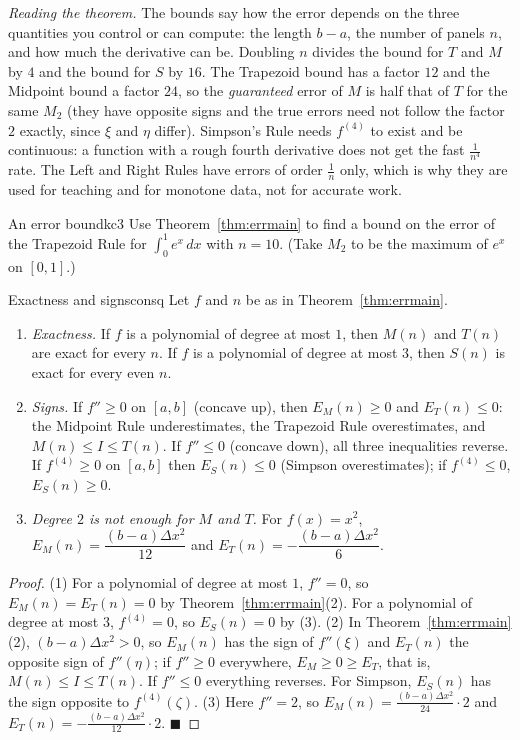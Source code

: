 \documentclass[11pt]{article}
\begin{document}
\emph{Reading the theorem.} The bounds say how the error depends on the three quantities you control or can compute: the length $b-a$, the number of panels $n$, and how much the derivative can be. Doubling $n$ divides the bound for $T$ and $M$ by $4$ and the bound for $S$ by $16$. The Trapezoid bound has a factor $12$ and the Midpoint bound a factor $24$, so the \emph{guaranteed} error of $M$ is half that of $T$ for the same $M_2$ (they have opposite signs and the true errors need not follow the factor $2$ exactly, since $\xi$ and $\eta$ differ). Simpson's Rule needs $f^{(4)}$ to exist and be continuous: a function with a rough fourth derivative does not get the fast $\frac1{n^4}$ rate. The Left and Right Rules have errors of order $\frac1n$ only, which is why they are used for teaching and for monotone data, not for accurate work.

\begin{kc}{An error bound}{kc3}
Use Theorem~\ref{thm:errmain} to find a bound on the error of the Trapezoid Rule for $\displaystyle\int_0^1e^x\,dx$ with $n=10$. (Take $M_2$ to be the maximum of $e^x$ on $[0,1]$.)
\end{kc}

\begin{thm}{Exactness and signs}{consq}
Let $f$ and $n$ be as in Theorem~\ref{thm:errmain}.
\begin{enumerate}[label=(\arabic*),leftmargin=*]
  \item \emph{Exactness.} If $f$ is a polynomial of degree at most $1$, then $M(n)$ and $T(n)$ are exact for every $n$. If $f$ is a polynomial of degree at most $3$, then $S(n)$ is exact for every even $n$.
  \item \emph{Signs.} If $f''\ge0$ on $[a,b]$ (concave up), then $E_M(n)\ge0$ and $E_T(n)\le0$: the Midpoint Rule underestimates, the Trapezoid Rule overestimates, and $M(n)\le I\le T(n)$. If $f''\le0$ (concave down), all three inequalities reverse. If $f^{(4)}\ge0$ on $[a,b]$ then $E_S(n)\le0$ (Simpson overestimates); if $f^{(4)}\le0$, $E_S(n)\ge0$.
  \item \emph{Degree $2$ is not enough for $M$ and $T$.} For $f(x)=x^2$, $E_M(n)=\dfrac{(b-a)\Delta x^2}{12}$ and $E_T(n)=-\dfrac{(b-a)\Delta x^2}{6}$.
\end{enumerate}
\end{thm}
\begin{proof}
(1) For a polynomial of degree at most $1$, $f''=0$, so $E_M(n)=E_T(n)=0$ by Theorem~\ref{thm:errmain}(2). For a polynomial of degree at most $3$, $f^{(4)}=0$, so $E_S(n)=0$ by (3). (2) In Theorem~\ref{thm:errmain}(2), $(b-a)\Delta x^2>0$, so $E_M(n)$ has the sign of $f''(\xi)$ and $E_T(n)$ the opposite sign of $f''(\eta)$; if $f''\ge0$ everywhere, $E_M\ge0\ge E_T$, that is, $M(n)\le I\le T(n)$. If $f''\le0$ everything reverses. For Simpson, $E_S(n)$ has the sign opposite to $f^{(4)}(\zeta)$. (3) Here $f''=2$, so $E_M(n)=\frac{(b-a)\Delta x^2}{24}\cdot2$ and $E_T(n)=-\frac{(b-a)\Delta x^2}{12}\cdot2$. $\blacksquare$
\end{proof}
\end{document}
